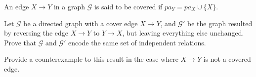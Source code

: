 \documentclass{amsmlaj}
\begin{document}
\begin{problem}
An edge $X \rightarrow Y$ in a graph $\mathcal{G}$ is said to be covered if $pa_Y = pa_X \cup \{X\}$.
\begin{modenumerate}
\item Let $\mathcal{G}$ be a directed graph with a cover edge $X \rightarrow Y$, and $\mathcal{G}'$ be the graph resulted by reversing the edge $X\rightarrow Y$ to $Y\rightarrow X$, but leaving everything else unchanged. Prove that $\mathcal{G}$ and $\mathcal{G}'$ encode the same set of independent relations.
\item Provide a counterexample to this result in the case where $X \rightarrow Y$ is not a covered edge.
\end{modenumerate}
\end{problem}
\end{document}
